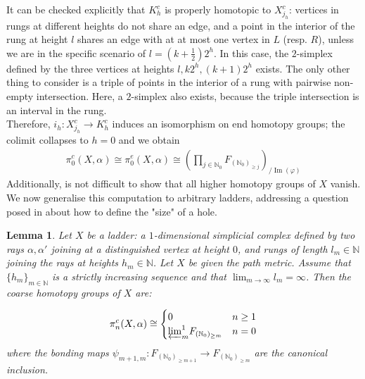 \documentclass[a4paper,11pt]{article}
\theoremstyle{definition}
\theoremstyle{plain}
\newtheorem{lemma}[definition]{Lemma}
\theoremstyle{remark}
\DeclareMathOperator{\image}{Im}
\begin{document}
{It can be checked explicitly that $K^c_{h}$ is properly homotopic to $X^c_{j_{h}}$: vertices in rungs at different heights do not share an edge, and a point in the interior of the rung at height $l$ shares an edge with at at most one vertex in $L$ (resp. $R$), unless we are in the specific scenario of $l = (k+\frac{1}{2})2^h$. In this case, the $2$-simplex defined by the three vertices at heights $l, k2^h, (k+1)2^h$ exists. The only other thing to consider is a triple of points in the interior of a rung with pairwise non-empty intersection. Here, a $2$-simplex also exists, because the triple intersection is an interval in the rung.\\

Therefore, $i_{h}: X^c_{j_{h}} \rightarrow K^c_{h}$ induces an isomorphism on end homotopy groups; the colimit collapses to $h=0$ and we obtain
\begin{align*}
\pi^c_{0}(X,\alpha) \cong \pi_{0}^{e}(X,\alpha) \cong  (\prod_{j\in \mathbb{N}_{0}} F_{(\mathbb{N}_{0})_{\geq j}})_{/\image(\varphi)}
\end{align*}
Additionally, is not difficult to show that all higher homotopy groups of $X$ vanish. \\

We now generalise this computation to arbitrary ladders, addressing a question posed in \cite{ashley2025interactions} about how to define the "size" of a hole.

\begin{lemma} \label{laddersize} Let $X$ be a ladder: a $1$-dimensional simplicial complex defined by two rays $\alpha,\alpha'$ joining at a distinguished vertex at height $0$, and rungs of length $l_{m}\in \mathbb{N}$  joining the rays at heights $h_{m} \in \mathbb{N}$. Let $X$ be given the path metric. Assume that $\{h_{m}\}_{m\in \mathbb{N}}$ is a strictly increasing sequence and that $\lim_{m\rightarrow \infty} l_{m}=\infty$. Then the coarse homotopy groups of $X$ are:

\[ \pi_{n}^{c}(X,\alpha) \cong \begin{cases} 
       0 &n\geq 1  \\
        {\varprojlim}^1_{m}  F_{(\mathbb{N}_{0})_{\geq m}} & n=0 \\ 
       \end{cases}
    \]
where the bonding maps $\psi_{m+1,m}: F_{(\mathbb{N}_{0})_{\geq m+1}} \rightarrow F_{(\mathbb{N}_{0})_{\geq m}}$ are the canonical inclusion. 
\end{lemma}

}
\end{document}
